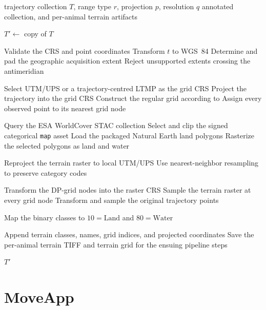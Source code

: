 \begin{algorithm}[htbp]
\caption{Per-animal terrain annotation}
\label{alg}
\begin{algorithmic}[1]
\Require trajectory collection \(T\), range type \(r\), projection \(p\), resolution \(q\)
\Ensure annotated collection, and per-animal terrain artifacts

\State \(T' \gets\) copy of \(T\)

\State Validate the CRS and point coordinates
\State Transform \(t\) to WGS~84
\State Determine and pad the geographic acquisition extent
\State Reject unsupported extents crossing the antimeridian

\State Select UTM/UPS or a trajectory-centred LTMP as the grid CRS
\State Project the trajectory into the grid CRS
\State Construct the regular grid according to 
\State Assign every observed point to its nearest grid node

    \State Query the ESA WorldCover STAC collection
    \State Select and clip the signed categorical \texttt{map} asset
\Else
    \State Load the packaged Natural Earth land polygons
    \State Rasterize the selected polygons as land and water
\EndIf

\State Reproject the terrain raster to local UTM/UPS
\State Use nearest-neighbor resampling to preserve category codes

\State Transform the DP-grid nodes into the raster CRS
\State Sample the terrain raster at every grid node
\State Transform and sample the original trajectory points

    \State Map the binary classes to \(10=\text{Land}\) and \(80=\text{Water}\)
\EndIf

\State Append terrain classes, names, grid indices, and projected coordinates
\State Save the per-animal terrain TIFF and terrain grid for the ensuing pipeline steps
\EndFor

\State \Return \(T'\)
\end{algorithmic}
\end{algorithm}


\section{MoveApp}
\label{sec:env-moveapp}
